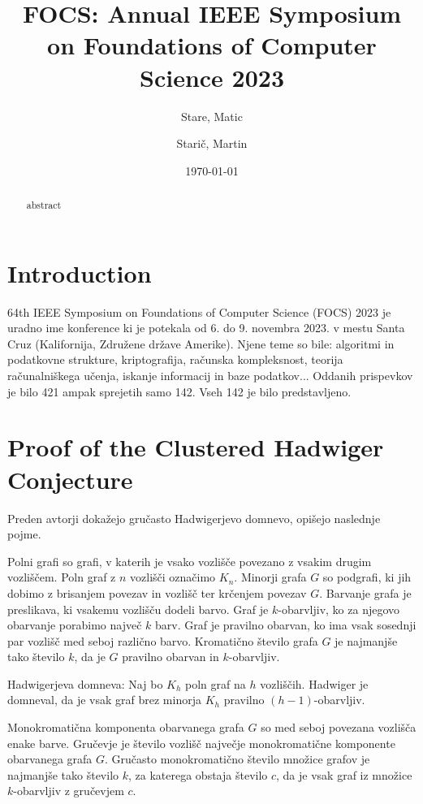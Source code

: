 \documentclass{article}
\title{FOCS: Annual IEEE Symposium on Foundations of Computer Science 2023}
\author{
  Stare, Matic\\
  \and
  Starič, Martin\\
}
\date{\today}
\begin{document}
\maketitle

\tableofcontents
\newpage


\begin{abstract}
    abstract
\end{abstract}



\section{Introduction}

64th IEEE Symposium on Foundations of Computer Science (FOCS) 2023 je uradno ime konference ki je potekala od 6. do 9. novembra 2023. v mestu Santa Cruz (Kalifornija, Združene države Amerike). Njene teme so bile: algoritmi in podatkovne strukture, kriptografija, računska kompleksnost, teorija računalniškega učenja, iskanje informacij in baze podatkov... Oddanih prispevkov je bilo 421 ampak sprejetih samo 142. Vseh 142 je bilo predstavljeno.

\section{Proof of the Clustered Hadwiger Conjecture}
Preden avtorji dokažejo gručasto Hadwigerjevo domnevo, opišejo naslednje pojme.



Polni grafi so grafi, v katerih je vsako vozlišče povezano z vsakim drugim vozliščem. Poln graf z $n$ vozlišči označimo $K_n$.                                                           
Minorji grafa $G$ so podgrafi, ki jih dobimo z brisanjem povezav in vozlišč ter krčenjem povezav $G$.
Barvanje grafa je preslikava, ki vsakemu vozlišču dodeli barvo.
Graf je $k$-obarvljiv, ko za njegovo obarvanje porabimo največ $k$ barv.
Graf je pravilno obarvan, ko ima vsak sosednji par vozlišč med seboj različno barvo.
Kromatično število grafa $G$ je najmanjše tako število $k$, da je $G$ pravilno obarvan in $k$-obarvljiv.

Hadwigerjeva domneva:
Naj bo $K_h$ poln graf na $h$ vozliščih.
Hadwiger je domneval, da je vsak graf brez minorja $K_h$ pravilno $(h - 1)$-obarvljiv.

Monokromatična komponenta obarvanega grafa $G$ so med seboj povezana vozlišča enake barve.
Gručevje je število vozlišč največje monokromatične komponente obarvanega grafa $G$.
Gručasto monokromatično število množice grafov je najmanjše tako število $k$, za katerega obstaja število $c$, da je vsak graf iz množice $k$-obarvljiv z gručevjem $c$.
\end{document}

